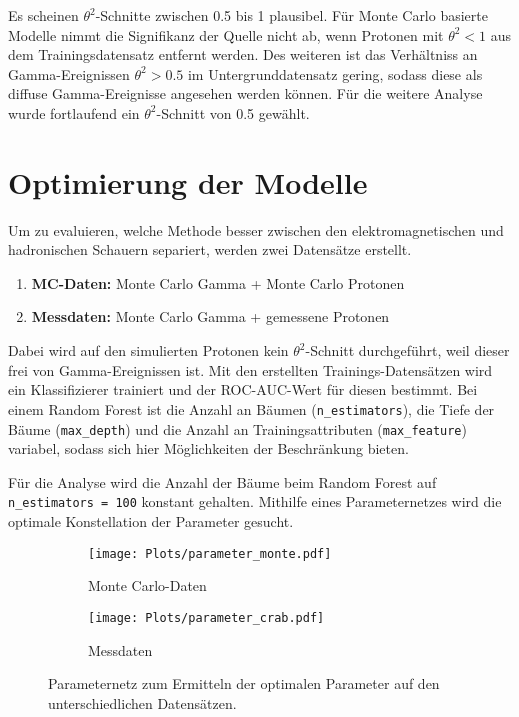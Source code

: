 Es scheinen $\theta^{2}$-Schnitte zwischen \num{0.5} bis \num{1} plausibel. 
Für Monte Carlo basierte Modelle nimmt die Signifikanz der Quelle nicht ab, wenn Protonen mit $\theta^{2} < \num{1}$ aus dem Trainingsdatensatz entfernt werden. 
Des weiteren ist das Verhältniss an Gamma-Ereignissen $\theta^{2} > \num{0.5}$ im Untergrunddatensatz gering, sodass diese als diffuse Gamma-Ereignisse angesehen werden können. 
Für die weitere Analyse wurde fortlaufend ein $\theta^{2}$-Schnitt von \num{0.5} gewählt. 
\newpage
\section{Optimierung der Modelle}
Um zu evaluieren, welche Methode besser zwischen den elektromagnetischen und hadronischen Schauern separiert, werden zwei Datensätze erstellt. 
\begin{enumerate}
  \item \textbf{MC-Daten:} Monte Carlo Gamma + Monte Carlo Protonen
  \item \textbf{Messdaten:} Monte Carlo Gamma + gemessene Protonen 
\end{enumerate}
Dabei wird auf den simulierten Protonen kein $\theta^{2}$-Schnitt durchgeführt, weil dieser frei von Gamma-Ereignissen ist.
Mit den erstellten Trainings-Datensätzen wird ein Klassifizierer trainiert und der ROC-AUC-Wert für diesen bestimmt.
Bei einem Random Forest ist die Anzahl an Bäumen (\texttt{n\_estimators}), die Tiefe der Bäume (\texttt{max\_depth}) und die Anzahl an Trainingsattributen (\texttt{max\_feature}) variabel, sodass sich hier Möglichkeiten der Beschränkung bieten.

Für die Analyse wird die Anzahl der Bäume beim Random Forest auf \texttt{n\_estimators = 100} konstant gehalten. 
Mithilfe eines Parameternetzes wird die optimale Konstellation der Parameter gesucht. 
\begin{figure}
  \begin{subfigure}[b]{0.5\textwidth}
	\texttt{[image: Plots/parameter\_monte.pdf]}
	\caption{Monte Carlo-Daten}
	\label{fig:mcGrid}
  \end{subfigure}
  \begin{subfigure}[b]{0.5\textwidth}
	\texttt{[image: Plots/parameter\_crab.pdf]}
	\caption{Messdaten}
	\label{fig:messGrid}
  \end{subfigure}
  \caption{Parameternetz zum Ermitteln der optimalen Parameter auf den unterschiedlichen Datensätzen.}
\end{figure}

